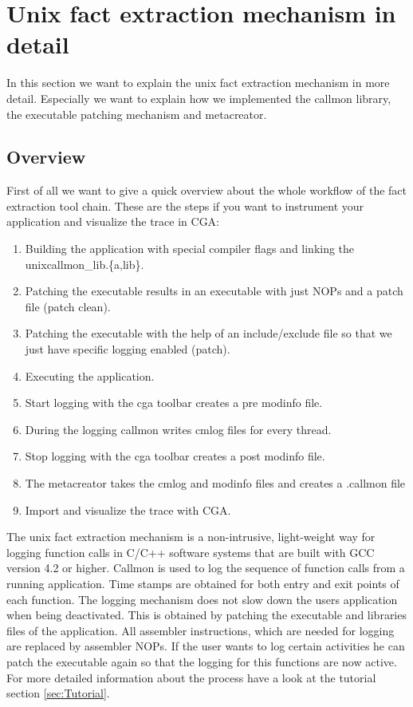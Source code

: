 
\section{Unix fact extraction mechanism in detail}

In this section we want to explain the unix fact extraction mechanism in more detail. Especially we want to explain how we implemented the callmon library, the executable patching mechanism and metacreator.

\subsection{Overview}

First of all we want to give a quick overview about the whole workflow of the fact extraction tool chain. These are the steps if you want to instrument your application and visualize the trace in CGA:

\begin{enumerate}
	\item Building the application with special compiler flags and linking the unixcallmon\_lib.\{a,lib\}.
	\item Patching the executable results in an executable with just NOPs and a patch file (patch clean).
	\item Patching the executable with the help of an include/exclude file so that we just have specific logging enabled (patch).
	\item Executing the application.
	\item Start logging with the cga toolbar creates a pre modinfo file.
	\item During the logging callmon writes cmlog files for every thread.
	\item Stop logging with the cga toolbar creates a post modinfo file.
	\item The metacreator takes the cmlog and modinfo files and creates a .callmon file
	\item Import and visualize the trace with CGA.
\end{enumerate}

The unix fact extraction mechanism is a non-intrusive, light-weight way for logging function calls in C/C++ software systems that are built with GCC version 4.2 or higher. Callmon is used to log the sequence of function calls from a running application. Time stamps are obtained for both entry and exit points of each function. The logging mechanism does not slow down the users application when being deactivated. This is obtained by patching the executable and libraries files of the application. All assembler instructions, which are needed for logging are replaced by assembler NOPs. If the user wants to log certain activities he can patch the executable again so that the logging for this functions are now active. For more detailed information about the process have a look at the tutorial section \ref{sec:Tutorial}.

